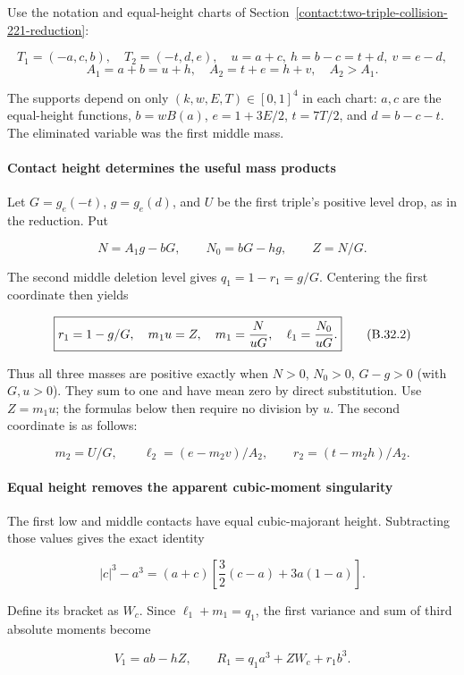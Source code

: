Use the notation and equal-height charts of Section~\ref{contact:two-triple-collision-221-reduction}:

\[
 T_1=(-a,c,b),\quad T_2=(-t,d,e),\quad
 u=a+c,\ h=b-c=t+d,\ v=e-d,
\]
\[
 A_1=a+b=u+h,\quad A_2=t+e=h+v,\quad A_2>A_1.
\]

The supports depend on only $(k,w,E,T) \in [0,1]^4$ in each chart:
$a,c$ are the equal-height functions, $b=w B(a)$, $e=1+3E/2$,
$t=7T/2$, and $d=b-c-t$. The eliminated variable was the first middle mass.

\paragraph{Contact height determines the useful mass products}

Let $G=g_e(-t)$, $g=g_e(d)$, and $U$ be the first triple's positive level
drop, as in the reduction. Put

\[
 N=A_1g-bG,\qquad N_0=bG-hg,\qquad Z=N/G.
\tag{B.32.1}\label{contact:two-triple-221-mass-elimination-1}
\]

The second middle deletion level gives $q_1=1-r_1=g/G$. Centering the first
coordinate then yields

\[
 \boxed{r_1=1-g/G,\quad m_1u=Z,\quad
 m_1={N\over uG},\quad \ell_1={N_0\over uG}.}
\tag{B.32.2}\label{contact:two-triple-221-mass-elimination-2}
\]

Thus all three masses are positive exactly when $N>0$, $N_0>0$, $G-g>0$
(with $G,u>0$). They sum to one and have mean zero by direct substitution.
Use $Z=m_1u$; the formulas below then require no division by $u$.
The second coordinate is as follows:

\[
 m_2=U/G,\qquad \ell_2=(e-m_2v)/A_2,\qquad
 r_2=(t-m_2h)/A_2.
\tag{B.32.3}\label{contact:two-triple-221-mass-elimination-3}
\]

\paragraph{Equal height removes the apparent cubic-moment singularity}

The first low and middle contacts have equal cubic-majorant height.
Subtracting those values gives the exact identity

\[
 |c|^3-a^3=(a+c)\left[\frac32(c-a)+3a(1-a)\right].
\]

Define its bracket as $W_c$. Since $\ell_1+m_1=q_1$, the first variance and
sum of third absolute moments become

\[
 \boxed{V_1=ab-hZ,\qquad
 R_1=q_1a^3+ZW_c+r_1b^3.}
\tag{B.32.4}\label{contact:two-triple-221-mass-elimination-4}
\]

